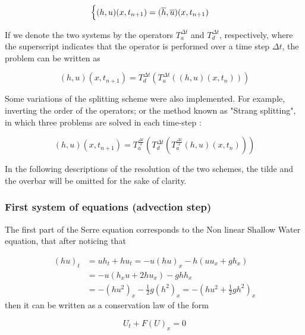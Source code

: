 \begin{equation}
\begin{cases}
(h,u)(x,t_{n+1}) = (\overline{h},\overline{u})(x,t_{n+1})
\end{cases}
\end{equation}

\indent If we denote the two systems by the operators $T_a^{\Delta t}$ and $T_d^{\Delta t}$, respectively, where the superscript indicates that the operator is performed over a time step $\Delta t$, the problem can be written as

\begin{equation}
(h,u)(x,t_{n+1}) = T_d^{\Delta t} \left( T_a^{\Delta t} \left((h,u)(x,t_n) \right) \right)
\end{equation}

\indent Some variations of the splitting scheme were also implemented. For example, inverting the order of the operators; or the method known as "Strang splitting", in which three problems are solved in each time-step :

\begin{equation}
(h,u)(x,t_{n+1}) = T_a^{\frac{\Delta t}{2}} \left( T_d^{\Delta t} \left( T_a^{\frac{\Delta t}{2}} (h,u)(x,t_n) \right) \right)
\end{equation}

\noindent In the following descriptions of the resolution of the two schemes, the tilde and the overbar will be omitted for the sake of clarity.

\subsubsection{First system of equations (advection step)}

\noindent The first part of the Serre equation corresponds to the Non linear Shallow Water equation, that after noticing that 

\begin{align*}
(hu)_t &= uh_t + hu_t = -u(hu)_x - h\left(uu_x + gh_x\right) \\
	&= -u\left (h_xu + 2hu_x \right) - ghh_x  \\
	&= -\left(hu^2\right)_x - \frac{1}{2}g\left(h^2\right)_x = - \left(hu^2 +  \frac{1}{2}gh^2 \right)_x
\end{align*}
\noindent then it can be written as a conservation law of the form

\begin{equation}
	U_t + F(U)_x = 0
	\label{serre:conservative_swe}
\end{equation}

